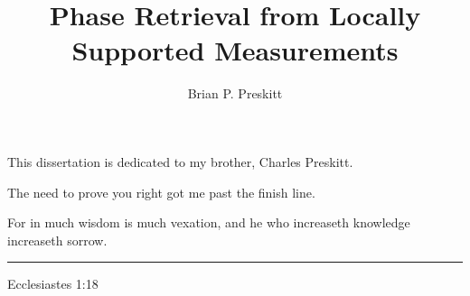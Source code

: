 \documentclass[12pt]{ucsd-thesis-2018}
\title{Phase Retrieval from Locally Supported Measurements}
\author{Brian P. Preskitt}
\begin{document}
\begin{frontmatter}

\maketitle

\copyrightpage

\approvalpage

\begin{dedication}
  \begin{center}
  \begin{minipage}{.7\textwidth}
    \centering{}
    This dissertation is dedicated to my brother, Charles Preskitt.
    
    The need to prove you right got me past the finish line.
  \end{minipage}
  \end{center}
\end{dedication}

\begin{epigraph}
  \begin{minipage}{.3\textwidth}
    \hfill
  \end{minipage}
  \begin{minipage}{.7\textwidth}
    \begin{flushleft}
      For in much wisdom is much vexation, and he who increaseth knowledge increaseth sorrow. \\%
    \end{flushleft}
    \begin{flushright}
      \rule[.5ex]{1cm}{.1pt} Ecclesiastes 1:18
    \end{flushright}
  \end{minipage}


\end{epigraph}
\end{frontmatter}
\end{document}
